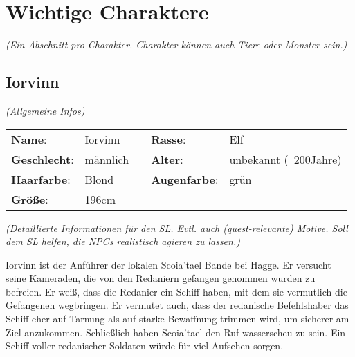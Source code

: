 {\let\clearpage\relax\chapter{Wichtige Charaktere}}

\textit{(Ein Abschnitt pro Charakter. Charakter können auch Tiere oder Monster sein.)}

\section{Iorvinn}

\textit{(Allgemeine Infos)}

\begin{longtable}{p{}p{4cm}p{1cm}p{}p{4cm}}
\hline
\textbf{Name}: & Iorvinn & & \textbf{Rasse}: & Elf \\ 
\textbf{Geschlecht}: & männlich & & \textbf{Alter}: & unbekannt (~200Jahre) \\
\textbf{Haarfarbe}: & Blond & & \textbf{Augenfarbe}: & grün \\
\textbf{Größe}: & 196cm & & & \\
\hline
\end{longtable}

\textit{(Detaillierte Informationen für den SL. Evtl. auch (quest-relevante) Motive. Soll dem SL helfen, die NPCs realistisch agieren zu lassen.)}

Iorvinn ist der Anführer der lokalen Scoia'tael Bande bei Hagge. Er versucht seine Kameraden, die von den Redaniern gefangen genommen wurden zu befreien. Er weiß, dass die Redanier ein Schiff haben, mit dem sie vermutlich die Gefangenen wegbringen. Er vermutet auch, dass der redanische Befehlshaber das Schiff eher auf Tarnung als auf starke Bewaffnung trimmen wird, um sicherer am Ziel anzukommen. Schließlich haben Scoia'tael den Ruf wasserscheu zu sein. Ein Schiff voller redanischer Soldaten würde für viel Aufsehen sorgen.
